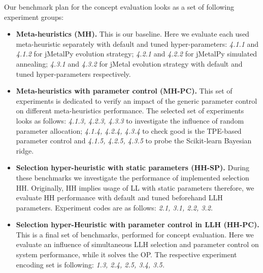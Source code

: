 Our benchmark plan for the concept evaluation looks as a set of following experiment groups:
\begin{itemize}
	\item \textbf{Meta-heuristics (MH).} This is our baseline. Here we evaluate each used meta-heuristic separately with default and tuned hyper-parameters: \emph{4.1.1} and \emph{4.1.2} for jMetalPy evolution strategy;  \emph{4.2.1} and \emph{4.2.2} for jMetalPy simulated annealing; \emph{4.3.1} and \emph{4.3.2} for jMetal evolution strategy with default and tuned hyper-parameters respectively.

	\item \textbf{Meta-heuristics with parameter control (MH-PC).} This set of experiments is dedicated to verify an impact of the generic parameter control on different meta-heuristics performance. The selected set of experiments looks as follows: \emph{4.1.3, 4.2.3, 4.3.3} to investigate the influence of random parameter allocation; \emph{4.1.4, 4.2.4, 4.3.4} to check good is the TPE-based parameter control and \emph{4.1.5, 4.2.5, 4.3.5} to probe the Scikit-learn Bayesian ridge.

	\item \textbf{Selection hyper-heuristic with static parameters (HH-SP).} During these benchmarks we investigate the performance of implemented selection HH. Originally, HH implies usage of LL with static parameters therefore, we evaluate HH performance with default and tuned beforehand LLH parameters. Experiment codes are as follows: \emph{2.1, 3.1, 2.2, 3.2.}
	
	\item \textbf{Selection hyper-Heuristic with parameter control in LLH (HH-PC).} This is a final set of benchmarks, performed for concept evaluation. Here we evaluate an influence of simultaneous LLH selection and parameter control on system performance, while it solves the OP. The respective experiment encoding set is following: \emph{1.3, 2.4, 2.5, 3.4, 3.5.}
\end{itemize}

